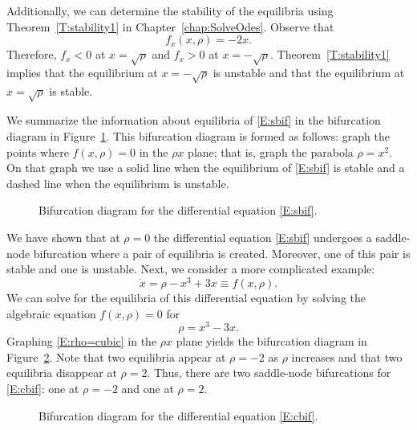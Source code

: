 \documentclass{ximera}
\begin{document}
Additionally, we can determine the stability
of the equilibria using 
Theorem~\ref{T:stability1} in Chapter~\ref{chap:SolveOdes}.  Observe that
\[
f_x(x,\rho) = -2x.
\]
Therefore, $f_x<0$ at $x=\sqrt{\rho}$ and $f_x>0$ at $x=-\sqrt{\rho}$.
Theorem~\ref{T:stability1} implies that the equilibrium at $x=-\sqrt{\rho}$ 
is unstable and that the equilibrium at $x=\sqrt{\rho}$ is stable.

We summarize the information about equilibria of \eqref{E:sbif} in the 
bifurcation diagram in Figure~\ref{F:sbifBIF}.  
This bifurcation diagram is formed as follows: graph the points where 
$f(x,\rho)=0$ in the $\rho x$ plane; that is, graph the parabola $\rho=x^2$.  
On that graph we use a solid line when the equilibrium of \eqref{E:sbif} is 
stable and a dashed line when the equilibrium is unstable.

\begin{figure}[htb]
           \centerline{%
           }
           \caption{Bifurcation diagram for the differential equation
        \protect\eqref{E:sbif}. }
           \label{F:sbifBIF}
\end{figure}

We have shown that at $\rho=0$ the differential equation \eqref{E:sbif} 
undergoes a saddle-node bifurcation
where a pair of equilibria is created.  Moreover, one of this pair is stable 
and one is unstable.  Next, we consider a more complicated example:
\begin{equation} \label{E:cbif}
\dot{x} = \rho - x^3 + 3x \equiv f(x,\rho).
\end{equation}
We can solve for the equilibria of this differential equation by solving
the algebraic equation $f(x,\rho)=0$ for
\begin{equation}  \label{E:rho=cubic}
\rho = x^3 - 3x.
\end{equation}
Graphing \eqref{E:rho=cubic} in the $\rho x$ plane yields the bifurcation 
diagram in Figure~\ref{F:cbifBIF}.  Note that two equilibria appear at 
$\rho=-2$ as $\rho$ increases and that two equilibria disappear at 
$\rho=2$.  Thus, there are two saddle-node bifurcations for \eqref{E:cbif}: 
one at $\rho=-2$ and one at $\rho=2$.

\begin{figure}[htb]
           \centerline{%
           }
           \caption{Bifurcation diagram for the differential equation
        \protect\eqref{E:cbif}.}
           \label{F:cbifBIF}
\end{figure} 
\end{document}
